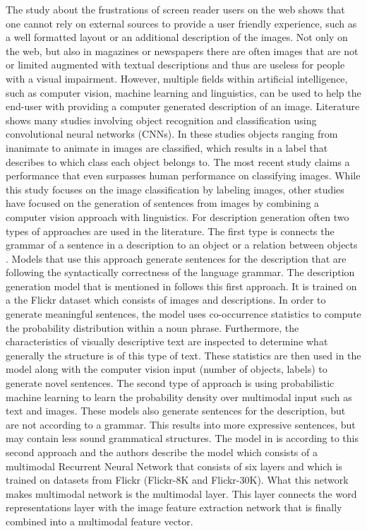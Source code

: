The study about the frustrations of screen reader users on the web shows that one cannot rely on external sources to provide a user friendly experience, such as a well formatted layout or an additional description of the images. Not only on the web, but also in magazines or newspapers there are often images that are not or limited augmented with textual descriptions and thus are useless for people with a visual impairment. However, multiple fields within artificial intelligence, such as computer vision, machine learning and linguistics, can be used to help the end-user with providing a computer generated description of an image. Literature shows many studies involving object recognition and classification \cite{carbonetto2004statistical, he2015delving} using convolutional neural networks (CNNs). In these studies objects ranging from inanimate to animate in images are classified, which results in a label that describes to which class each object belongs to. The most recent study \cite{he2015delving} claims a performance that even surpasses human performance on classifying images. 
While this study focuses on the image classification by labeling images, other studies \cite{mao2014explain, mitchell2012midge, Yang2011, Farhadi2010} have focused on the generation of sentences from images by combining a computer vision approach with linguistics. For description generation often two types of approaches are used in the literature. The first type is connects the grammar of a sentence in a description to an object or a relation between objects \cite{karpathyfeifei2014deep}. Models that use this approach generate sentences for the description that are following the syntactically correctness of the language grammar. The description generation model that is mentioned in \cite{mitchell2012midge} follows this first approach. It is trained on a the Flickr dataset which consists of images and descriptions. In order to generate meaningful sentences, the model uses co-occurrence statistics to compute the probability distribution within a noun phrase. Furthermore, the characteristics of visually descriptive text are inspected to determine what generally the structure is of this type of text. These statistics are then used in the model along with the computer vision input (number of objects, labels) to generate novel sentences.
The second type of approach is using probabilistic machine learning to learn the probability density over multimodal input such as text and images. These models also generate sentences for the description, but are not according to a grammar. This results into more expressive sentences, but may contain less sound grammatical structures. The model in \cite{mao2014explain} is according to this second approach and the authors describe the model which consists of a multimodal Recurrent Neural Network that consists of six layers and which is trained on datasets from Flickr (Flickr-8K and Flickr-30K). What this network makes multimodal network is the multimodal layer. This layer connects the word representations layer with the image feature extraction network that is finally combined into a multimodal feature vector. 

